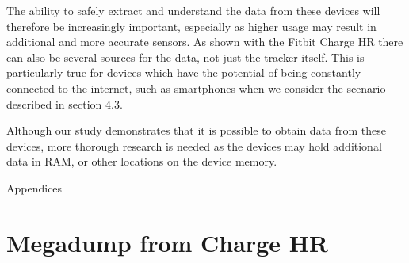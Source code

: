 \documentclass[a4paper,11pt,dvips]{article}
\begin{document}
The ability to safely extract and understand the data from these devices will therefore be increasingly important, especially as higher usage may result in additional and more accurate sensors. As shown with the Fitbit Charge HR there can also be several sources for the data, not just the tracker itself. This is particularly true for devices which have the potential of being constantly connected to the internet, such as smartphones when we consider the scenario described in section 4.3.  

Although our study demonstrates that it is possible to obtain data from these devices, more thorough research is needed as the devices may hold additional data in RAM, or other locations on the device memory. 




\newpage
\appendix
\noindent
\Huge{Appendices}
\normalsize
\section{Megadump from Charge HR}\label{app:megadump}
\end{document}
